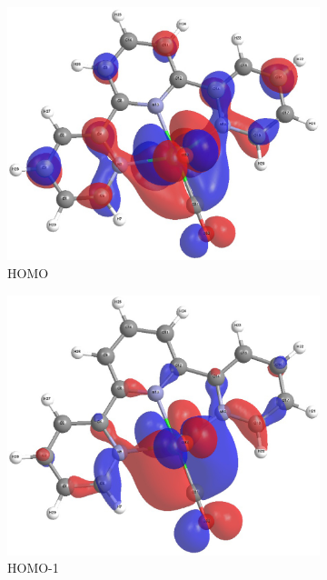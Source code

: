 \begin{figure}[!ht]
\begin{subfigure}[b]{0.31\textwidth}
  \includegraphics[clip=true, width=\textwidth, keepaspectratio]{images/mos/2h.eps}
  \caption{HOMO}
 \end{subfigure}
 \begin{subfigure}[b]{0.31\textwidth}
  \includegraphics[clip=true, width=\textwidth, keepaspectratio]{images/mos/2h-1.eps}
  \caption{HOMO-1}
 \end{subfigure}
 \begin{subfigure}[b]{0.31\textwidth}

\end{subfigure}
\end{figure}
